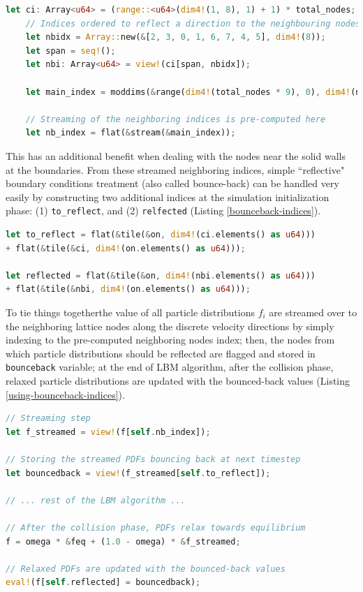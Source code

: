 \begin{lstlisting}[language=Rust, caption=Pre-computed streaming step in the way of shifting indices during the program intialization phase., label=nb-index]
	let ci: Array<u64> = (range::<u64>(dim4!(1, 8), 1) + 1) * total_nodes;
	// Indices ordered to reflect a direction to the neighbouring nodes
	let nbidx = Array::new(&[2, 3, 0, 1, 6, 7, 4, 5], dim4!(8));
	let span = seq!();
	let nbi: Array<u64> = view!(ci[span, nbidx]);
	
	let main_index = moddims(&range(dim4!(total_nodes * 9), 0), dim4!(nx, ny, 9));
	
	// Streaming of the neighboring indices is pre-computed here
	let nb_index = flat(&stream(&main_index));
\end{lstlisting}

This has an additional benefit when dealing with the nodes near the solid walls at the boundaries. From these streamed neighboring indices, simple ``reflective" boundary conditions treatment (also called bounce-back) can be handled very easily by constructing two additional indices at the simulation initialization phase: (1) \texttt{to\_reflect}, and (2) \texttt{relfected} (Listing \ref{bounceback-indices}). 

\begin{lstlisting}[language=Rust, caption=Bounce-back indices., label=bounceback-indices]
let to_reflect = flat(&tile(&on, dim4!(ci.elements() as u64)))
+ flat(&tile(&ci, dim4!(on.elements() as u64)));

let reflected = flat(&tile(&on, dim4!(nbi.elements() as u64)))
+ flat(&tile(&nbi, dim4!(on.elements() as u64)));
\end{lstlisting}

To tie things together\textemdash the value of all particle distributions $f_i$ are streamed over to the neighboring lattice nodes along the discrete velocity directions by simply indexing to the pre-computed neighboring nodes index; then, the nodes from which particle distributions should be reflected are flagged and stored in \texttt{bounceback} variable; at the end of LBM algorithm, after the collision phase, relaxed particle distributions are updated with the bounced-back values (Listing \ref{using-bounceback-indices}).

\begin{lstlisting}[language=Rust, caption=Streaming and boundaries treatment by relfection using the bounce-back indices., label=using-bounceback-indices]
// Streaming step
let f_streamed = view!(f[self.nb_index]);

// Storing the streamed PDFs bouncing back at next timestep
let bouncedback = view!(f_streamed[self.to_reflect]);

// ... rest of the LBM algorithm ...

// After the collision phase, PDFs relax towards equilibrium
f = omega * &feq + (1.0 - omega) * &f_streamed;

// Relaxed PDFs are updated with the bounced-back values 
eval!(f[self.reflected] = bouncedback);
\end{lstlisting}


